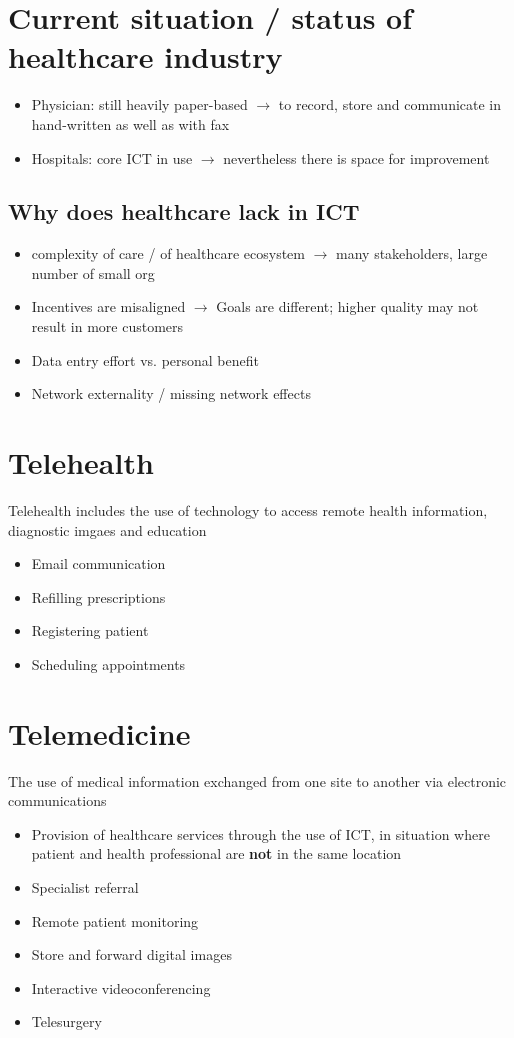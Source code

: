 \documentclass{report}
\theoremstyle{definition}
\theoremstyle{example}
\begin{document}
\section{Current situation / status of healthcare industry}
\begin{itemize}
   \item Physician: still heavily paper-based $\rightarrow$ to record, store and communicate in hand-written as well as with fax
   \item Hospitals: core ICT in use $\rightarrow$ nevertheless there is space for improvement
\end{itemize}

   \subsection{Why does healthcare lack in ICT}
\begin{itemize}
   \item complexity of care / of healthcare ecosystem $\rightarrow$ many stakeholders, large number of small org
   \item Incentives are misaligned $\rightarrow$ Goals are different; higher quality may not result in more customers
   \item Data entry effort vs. personal benefit
   \item Network externality / missing network effects
\end{itemize}

\section{Telehealth}
Telehealth includes the use of technology to access remote health information, diagnostic imgaes and education
\begin{itemize}
   \item Email communication
   \item Refilling prescriptions
   \item Registering patient
   \item Scheduling appointments
\end{itemize}

\section{Telemedicine}
The use of medical information exchanged from one site to another via electronic communications
\begin{itemize}
   \item Provision of healthcare services through the use of ICT, in situation where patient and health professional are \textbf{not} in the same location
   \item Specialist referral
   \item Remote patient monitoring
   \item Store and forward digital images
   \item Interactive videoconferencing
   \item Telesurgery
\end{itemize}
\end{document}
